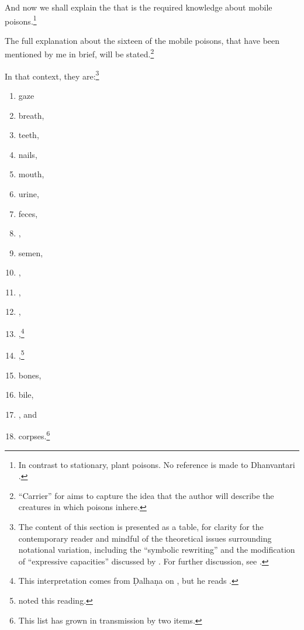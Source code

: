 \begin{translation}
  
  \item[1] 
  
And now we shall explain the  that is the
required knowledge about mobile poisons.\footnote{In contrast to
    stationary, plant poisons.  No reference is made to Dhanvantari
    \citep[see][]{birc-2021}.}

  \item[3] 
  
The full explanation about the sixteen  of
the mobile poisons, that have been mentioned by me in brief, will be
stated.\footnote{“Carrier” for  aims
    to capture the idea that the author will describe the creatures in
    which poisons inhere.}
  
\item[4] 

In that context, they are:\footnote{The content of this section is
    presented as a table, for clarity for the contemporary reader and
    mindful of the theoretical issues surrounding notational variation,
    including the “symbolic rewriting” and the modification of “expressive
    capacities” discussed by \citet[321\,ff]{saru-2016}.  For further
    discussion, see \cite[81--83]{wuja-2021}.}
  \begin{multicols}{2}
      
  \begin{enumerate} 
      
      \item gaze       				%
      \item  breath,       			%
  \item teeth, 						%
      \item nails, 					%
      \item mouth,      			%
      \item urine,					%
      \item feces,					%
    \item {},  %
    \item semen,					%
    \item {},				%
   \item {}, %
  \item {},  %
  \item {},\footnote{This interpretation  comes from
    Ḍalhaṇa on , but he reads .} %
   \item {},\footnote{ noted this 
   reading.} %
\item  bones, %
\item  bile, %
\item  {}, and  %
\item corpses.\footnote{This list has grown in transmission by two items.}  
\end{enumerate} 
\end{multicols} 


\end{translation}
